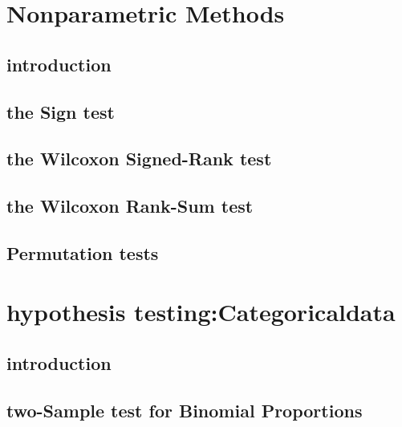 \documentclass[12pt,]{article}
\begin{document}
\hypertarget{nonparametric-methods}{%
\section{Nonparametric Methods}\label{nonparametric-methods}}

\hypertarget{introduction-5}{%
\subsection{introduction}\label{introduction-5}}

\hypertarget{the-sign-test}{%
\subsection{the Sign test}\label{the-sign-test}}

\hypertarget{the-wilcoxon-signed-rank-test}{%
\subsection{the Wilcoxon Signed-Rank
test}\label{the-wilcoxon-signed-rank-test}}

\hypertarget{the-wilcoxon-rank-sum-test}{%
\subsection{the Wilcoxon Rank-Sum
test}\label{the-wilcoxon-rank-sum-test}}

\hypertarget{permutation-tests}{%
\subsection{Permutation tests}\label{permutation-tests}}

\hypertarget{hypothesis-testingcategoricaldata}{%
\section{hypothesis
testing:Categoricaldata}\label{hypothesis-testingcategoricaldata}}

\hypertarget{introduction-6}{%
\subsection{introduction}\label{introduction-6}}

\hypertarget{two-sample-test-for-binomial-proportions}{%
\subsection{two-Sample test for Binomial
Proportions}\label{two-sample-test-for-binomial-proportions}}
\end{document}
